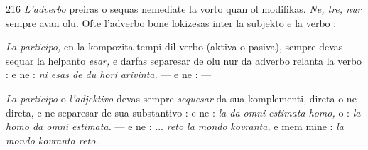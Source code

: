 \begin{VUpage}[220]{216}
\textit{L'adverbo} preiras o sequas nemediate la vorto quan ol\nl
modifikas. \textit{Ne, tre, nur} sempre avan olu. Ofte l'adverbo bone\nl
lokizesas inter la subjekto e la verbo : \nl
{}

\textit{La participo,} en la kompozita tempi dil verbo (aktiva o\nl
pasiva), sempre devas sequar la helpanto \textit{esar,} e darfas\nl
separesar de olu nur da adverbo relanta la verbo : \nl
{} e ne : \textit{ni esas de du hori arivinta.} ---\nl
{} e ne : \nl
--- 

\textit{La participo} o \textit{l'adjektivo} devas sempre \textit{sequesar} da sua\nl
komplementi, direta o ne direta, e ne separesar de sua\nl
substantivo :  e ne : \textit{la da omni}\nl
\textit{estimata homo,} o : \textit{la homo da omni estimata.} --- \nl
{} e ne : ... \textit{reto la mondo}\nl
\textit{kovranta,} e mem mine : \textit{la mondo kovranta reto.}


\end{VUpage}

